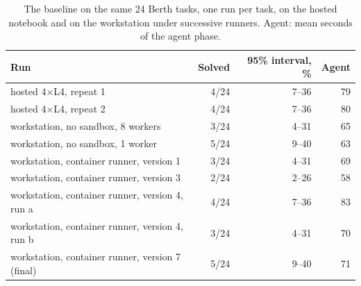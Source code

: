\begin{table}[t]
\centering
\small
\caption{The baseline on the same 24 Berth tasks, one run per task, on the hosted notebook and on the workstation under successive runners. Agent: mean seconds of the agent phase.}
\label{tab:parity}
\begin{tabular}{lrrr}
\toprule
Run & Solved & 95\% interval, \% & Agent \\
\midrule
hosted 4$\times$L4, repeat 1 & 4/24 & 7--36 & 79 \\
hosted 4$\times$L4, repeat 2 & 4/24 & 7--36 & 80 \\
\addlinespace
workstation, no sandbox, 8 workers & 3/24 & 4--31 & 65 \\
workstation, no sandbox, 1 worker & 5/24 & 9--40 & 63 \\
workstation, container runner, version 1 & 3/24 & 4--31 & 69 \\
workstation, container runner, version 3 & 2/24 & 2--26 & 58 \\
workstation, container runner, version 4, run a & 4/24 & 7--36 & 83 \\
workstation, container runner, version 4, run b & 3/24 & 4--31 & 70 \\
workstation, container runner, version 7 (final) & 5/24 & 9--40 & 71 \\
\bottomrule
\end{tabular}
\par\vspace{3pt}{\footnotesize\raggedright A further workstation run under runner version 2 solved 4 of 24; its result rows were not kept and it is not in the released file.\par}
\end{table}
